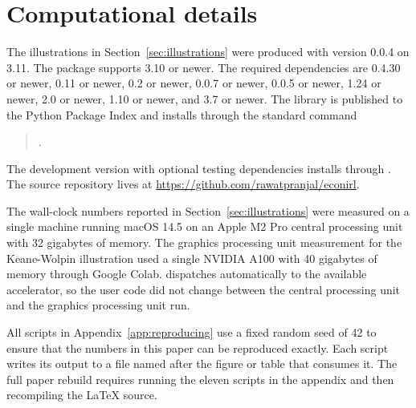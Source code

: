 \section{Computational details} \label{sec:computational}

The illustrations in Section~\ref{sec:illustrations} were produced with  version 0.0.4 on  3.11. The package supports  3.10 or newer. The required dependencies are  0.4.30 or newer,  0.11 or newer,  0.2 or newer,  0.0.7 or newer,  0.0.5 or newer,  1.24 or newer,  2.0 or newer,  1.10 or newer, and  3.7 or newer. The library is published to the Python Package Index and installs through the standard command
\begin{quote}
.
\end{quote}
The development version with optional testing dependencies installs through . The source repository lives at \url{https://github.com/rawatpranjal/econirl}.

The wall-clock numbers reported in Section~\ref{sec:illustrations} were measured on a single machine running macOS 14.5 on an Apple M2 Pro central processing unit with 32 gigabytes of memory. The graphics processing unit measurement for the Keane-Wolpin illustration used a single NVIDIA A100 with 40 gigabytes of memory through Google Colab.  dispatches automatically to the available accelerator, so the user code did not change between the central processing unit and the graphics processing unit run.

All scripts in Appendix~\ref{app:reproducing} use a fixed random seed of 42 to ensure that the numbers in this paper can be reproduced exactly. Each script writes its output to a file named after the figure or table that consumes it. The full paper rebuild requires running the eleven scripts in the appendix and then recompiling the LaTeX source.
